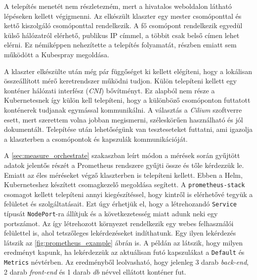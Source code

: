 A telepítés menetét nem részletezném, mert a hivatalos weboldalon\citep{kubeadmInstallCluster} látható lépéseken kellett végigmenni. 
Az elkészült klaszter egy mester csomóponttal és kettő kiszolgáló csomóponttal rendelkezik.
A fő csomópont rendelkezik egyedül külső hálózatról elérhető, publikus IP címmel, a többit csak belső címen lehet elérni.
Ez némiképpen nehezítette a telepítés folyamatát, részben emiatt sem működött a Kubespray megoldása. 

A klaszter elkészülte után még pár függőséget ki kellett elégíteni, hogy a lokálisan összeállított mérő keretrendszer működni tudjon.
Külön telepíteni kellett egy konténer hálózati interfész (\textit{CNI}) bővítményt.
Ez alapból nem része a Kubernetesnek így külön kell telepíteni, hogy a különböző csomóponton futtatott konténerek tudjanak egymással kommunikálni.
A választás a \textit{Cilium} szoftverre esett, mert szerettem volna jobban megismerni, széleskörűen használható és jól dokumentált.
Telepítése után lehetőségünk van teszteseteket futtatni, ami igazolja a klaszterben a csomópontok és kapszulák kommunikációját. 

A \ref{sec:measure_orchestrate} szakaszban leírt módon a mérések során gyűjtött adatok jelentős részét a Prometheus rendszere gyűjti össze és tőle kérdezzük le. 
Emiatt az éles méréseket végző klaszterben is telepíteni kellett. 
Ebben a Helm, Kuberneteshez készített csomagkezelő megoldása segített. 
A \verb+prometheus-stack+ csomagot kellett telepíteni annyi kiegészítéssel, hogy kintről is elérhetővé tegyük a felületet és szolgáltatásait. 
Ezt úgy érhetjük el, hogy a létrehozandó \verb+Service+  típusát \verb+NodePort+-ra állítjuk és a következetesség miatt adunk neki egy portszámot. 
Az így létrehozott környezet rendelkezik egy webes felhasználói felülettel is, ahol tetszőleges lekérdezéseket indíthatunk. 
Egy ilyen lekérdezés látszik az \ref{fig:prometheus_example} ábrán is. 
A példán az látszik, hogy milyen eredményt kapunk, ha lekérdezzük az aktuálisan futó kapszulákat a \verb+Default+ és \verb+Metrics+ névtérben. 
Az eredményből leolvasható, hogy jelenleg 3 darab \textit{back-end}, 2 darab \textit{front-end} és 1 darab \textit{db} névvel ellátott konténer fut. \\

